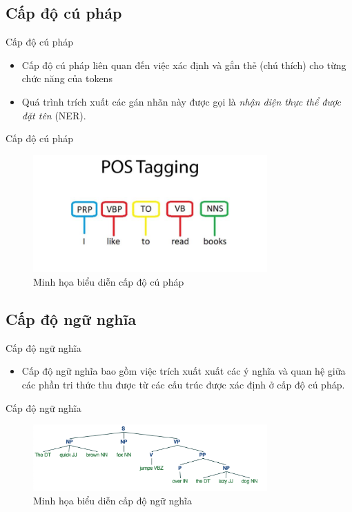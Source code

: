 \documentclass[10pt]{beamer}
\theoremstyle{remark}
\theoremstyle{definition}
\begin{document}
\subsection{Cấp độ cú pháp}

\begin{frame}{Cấp độ cú pháp}
	\begin{itemize}
		\item Cấp độ cú pháp liên quan đến việc xác định và gắn thẻ (chú thích) cho từng chức năng của tokens
		\item Quá trình trích xuất các gán nhãn này được gọi là \textit{nhận diện thực thể được đặt tên} (NER).
	\end{itemize}
\end{frame}

\begin{frame}{Cấp độ cú pháp}
	\begin{figure}[h!]
        \centering
        \includegraphics[width=0.8\textwidth]{syntatic.jpg}
        \caption{Minh họa biểu diễn cấp độ cú pháp}
        \label{fig:syntatic}
    \end{figure}
\end{frame}

\subsection{Cấp độ ngữ nghĩa}

\begin{frame}{Cấp độ ngữ nghĩa}
	\begin{itemize}
		\item Cấp độ ngữ nghĩa bao gồm việc trích xuất xuất các ý nghĩa và quan hệ giữa các phần tri thức thu được từ các cấu trúc được xác định ở cấp độ cú pháp.
	\end{itemize}
\end{frame}

\begin{frame}{Cấp độ ngữ nghĩa}
	\begin{figure}[h!]
        \centering
        \includegraphics[width=0.8\textwidth]{semantic.png}
        \caption{Minh họa biểu diễn cấp độ ngữ nghĩa}
        \label{fig:semantic}
    \end{figure}
\end{frame}
\end{document}

